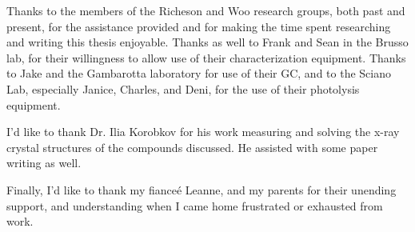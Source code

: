 
Thanks to the members of the Richeson and Woo research groups, both past and present, for the assistance provided and for making the time spent researching and writing this thesis enjoyable. Thanks as well to Frank and Sean in the Brusso lab, for their willingness to allow use of their characterization equipment. Thanks to Jake and the Gambarotta laboratory for use of their GC, and to the Sciano Lab, especially Janice, Charles, and Deni, for the use of their photolysis equipment. 

I'd like to thank Dr. Ilia Korobkov for his work measuring and solving the x-ray crystal structures of the compounds discussed. He assisted with some paper writing as well. 

Finally, I'd like to thank my fiance\'{e}  Leanne, and my parents for their unending support, and understanding when I came home frustrated or exhausted from work.